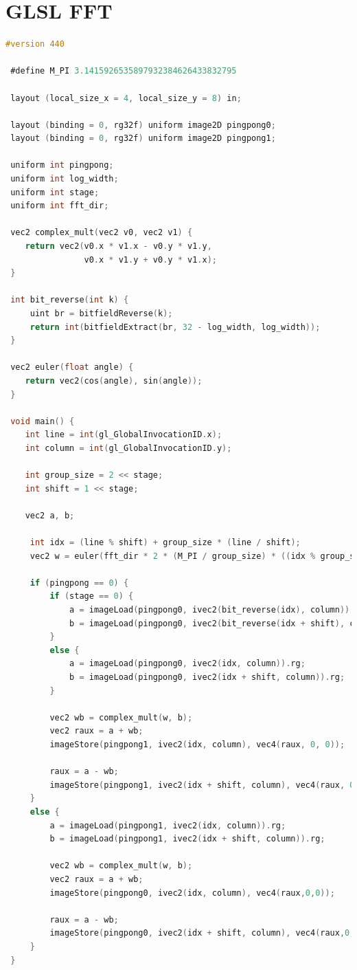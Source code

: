 \documentclass[
  oneside,
  11pt, a4paper,
  footinclude=true,
  headinclude=true,
  cleardoublepage=empty
]{scrbook}
\begin{document}
\chapter{GLSL FFT} \label{apdx:glsl-fft}

\begin{lstlisting}[language=C,caption={FFT Radix-2 Cooley-Tukey Horizontal stage pass, see \autoref{sec:ct-impl}},label={lst:glsl-radix2-ct-stage-horizontal}]
 #version 440
 
 #define M_PI 3.1415926535897932384626433832795
 
 layout (local_size_x = 4, local_size_y = 8) in;
 
 layout (binding = 0, rg32f) uniform image2D pingpong0;
 layout (binding = 0, rg32f) uniform image2D pingpong1;
 
 uniform int pingpong;
 uniform int log_width;
 uniform int stage;
 uniform int fft_dir;
 
 vec2 complex_mult(vec2 v0, vec2 v1) {
 	return vec2(v0.x * v1.x - v0.y * v1.y,
 				v0.x * v1.y + v0.y * v1.x);
 }
 
 int bit_reverse(int k) {
     uint br = bitfieldReverse(k);
     return int(bitfieldExtract(br, 32 - log_width, log_width));
 }
 
 vec2 euler(float angle) {
 	return vec2(cos(angle), sin(angle));
 }
 
 void main() {
 	int line = int(gl_GlobalInvocationID.x);
 	int column = int(gl_GlobalInvocationID.y);
 
 	int group_size = 2 << stage;
 	int shift = 1 << stage;
 
 	vec2 a, b;
 
     int idx = (line % shift) + group_size * (line / shift);
     vec2 w = euler(fft_dir * 2 * (M_PI / group_size) * ((idx % group_size) % shift));
 
     if (pingpong == 0) {
         if (stage == 0) {
             a = imageLoad(pingpong0, ivec2(bit_reverse(idx), column)).rg;
             b = imageLoad(pingpong0, ivec2(bit_reverse(idx + shift), column)).rg;
         }
         else {
             a = imageLoad(pingpong0, ivec2(idx, column)).rg;
             b = imageLoad(pingpong0, ivec2(idx + shift, column)).rg;
         }

         vec2 wb = complex_mult(w, b);
         vec2 raux = a + wb;
         imageStore(pingpong1, ivec2(idx, column), vec4(raux, 0, 0));
             
         raux = a - wb;
         imageStore(pingpong1, ivec2(idx + shift, column), vec4(raux, 0, 0));
     }
     else {
         a = imageLoad(pingpong1, ivec2(idx, column)).rg;
         b = imageLoad(pingpong1, ivec2(idx + shift, column)).rg;

         vec2 wb = complex_mult(w, b);
         vec2 raux = a + wb;
         imageStore(pingpong0, ivec2(idx, column), vec4(raux,0,0));
             
         raux = a - wb;
         imageStore(pingpong0, ivec2(idx + shift, column), vec4(raux,0,0));
     }
 }
\end{lstlisting}
\end{document}
